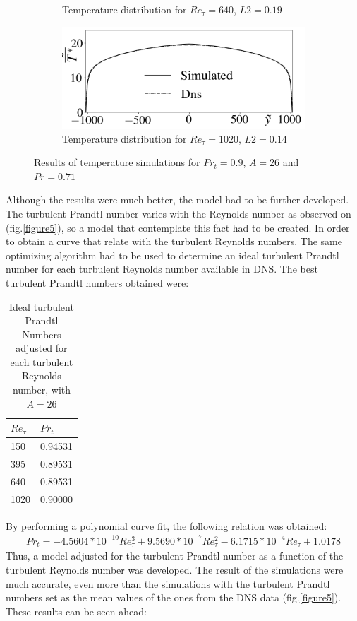 \documentclass[10pt]{article} %
\begin{document}
\begin{figure}[!h]
\begin{subfigure}[t]{0.5\textwidth}
		\caption{Temperature distribution for $Re_\tau = 640$, $L2 = 0.19$}
	\end{subfigure}
	\begin{subfigure}[t]{0.45\textwidth}
		\centering
		\includegraphics[angle=0, scale=0.3]{fotos_formatacao_final/Temperature_1000_071_Prt0905_A26}
		\caption{Temperature distribution for $Re_\tau = 1020$, $L2 = 0.14$}
	\end{subfigure}	
	\caption{Results of temperature simulations for $Pr_t = 0.9 $, $A = 26$ and $Pr =0.71$ }
\end{figure}

Although the results were much better, the model had to be further developed. The turbulent Prandtl number varies with the Reynolds number as observed on (fig.\ref{figure5}), so a model that contemplate this fact had to be created. 
In order to obtain a curve that relate with the turbulent Reynolds numbers. The same optimizing algorithm had to be used to determine an ideal turbulent Prandtl number for each turbulent Reynolds number available in DNS.
The best turbulent Prandtl numbers obtained were:

\begin{table}[!h]
	\centering
	\caption{Ideal turbulent Prandtl Numbers adjusted for each turbulent Reynolds number, with $A = 26$}
	\begin{tabular}{ll}
		  \hline
		  $Re_\tau$ & $Pr_t$\\
		  \hline
		  150  &   0.94531\\
		  395  &   0.89531\\
		  640  &   0.89531\\
		  1020 &   0.90000\\ 
		  \hline
	\end{tabular}
\end{table}



By performing a polynomial curve fit, the following relation was obtained:
\begin{equation}
\begin{split}
Pr_t = -4.5604 * 10^{-10} Re_\tau^3 + 9.5690 * 10^{-7} Re_\tau^2 - 6.1715 *10 ^{-4} Re_\tau + 1.0178 
\end{split}
\end{equation}
Thus, a model adjusted for the turbulent Prandtl number as a function of the turbulent Reynolds number was developed. The result of the simulations were much accurate, even more than the simulations with the turbulent Prandtl numbers set as the mean values of the ones from the DNS data (fig.\ref{figure5}). These results can be seen ahead:
\end{document}
